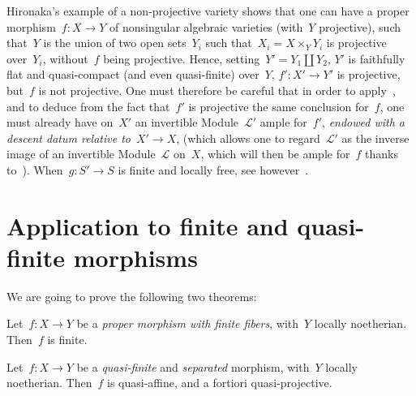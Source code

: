 \begin{remarks}
\label{VIII.5.10}
Hironaka's example of a non-projective variety shows that one
can have a proper morphism~$f\colon X\to Y$ of nonsingular
algebraic varieties (with~$Y$ projective), such that~$Y$
is the union of two open sets~$Y_{i}$ such
that~$X_{i}=X\times_{Y}Y_{i}$ is projective over~$Y_{i}$, without~$f$
being projective. Hence, setting~$Y'=Y_{1}\amalg Y_{2}$, $Y'$
is faithfully flat and quasi-compact (and even quasi-finite)
over~$Y$, $f'\colon X'\to Y'$ is projective, but~$f$ is not
projective. One must therefore be careful that in order to
apply~, and to deduce from the fact that~$f'$ is
projective the same conclusion for~$f$, one must already have
on~$X'$ an invertible Module~$\mathcal{L}'$ ample for~$f'$,
\emph{endowed with a descent datum relative to}~$X'\to X$,
(which allows one to regard~$\mathcal{L}'$ as the inverse image
of an invertible Module~$\mathcal{L}$ on~$X$, which will then be ample
for~$f$ thanks to~). When~$g\colon S'\to S$
is finite and locally free, see however~.
\end{remarks}

\section[Application to finite and quasi-finite morphisms]{Application to finite and quasi-finite morphisms\protect\footnotemark}
\label{VIII.6}

We are going to prove the following two theorems:

\begin{theorem}
\label{VIII.6.1}
Let~$f\colon X\to Y$ be a \emph{proper morphism with finite fibers},
with~$Y$ locally noetherian. Then~$f$ is finite.
\end{theorem}

\begin{theorem}
\label{VIII.6.2}
Let~$f\colon X\to Y$ be a \emph{quasi-finite} and
\emph{separated} morphism, with~$Y$ locally noetherian. Then~$f$
is quasi-affine, and a fortiori quasi-projective.
\end{theorem}


